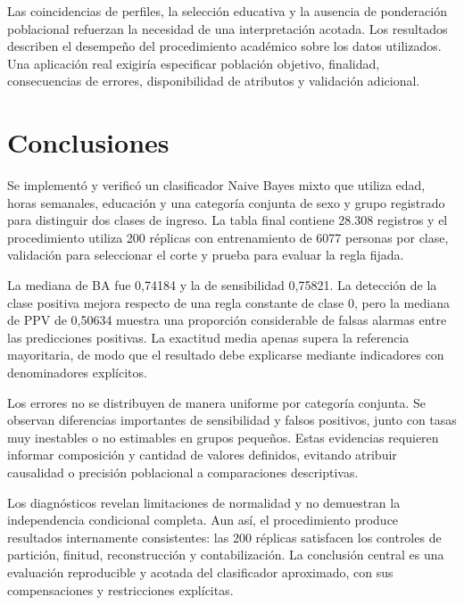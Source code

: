 \documentclass[11pt,a4paper]{article}
\begin{document}
Las coincidencias de perfiles, la selección educativa y la ausencia de ponderación poblacional refuerzan la necesidad de una interpretación acotada. Los resultados describen el desempeño del procedimiento académico sobre los datos utilizados. Una aplicación real exigiría especificar población objetivo, finalidad, consecuencias de errores, disponibilidad de atributos y validación adicional.

\section{Conclusiones}
Se implementó y verificó un clasificador Naive Bayes mixto que utiliza edad, horas semanales, educación y una categoría conjunta de sexo y grupo registrado para distinguir dos clases de ingreso. La tabla final contiene 28.308 registros y el procedimiento utiliza 200 réplicas con entrenamiento de 6077 personas por clase, validación para seleccionar el corte y prueba para evaluar la regla fijada.

La mediana de BA fue 0,74184 y la de sensibilidad 0,75821. La detección de la clase positiva mejora respecto de una regla constante de clase 0, pero la mediana de PPV de 0,50634 muestra una proporción considerable de falsas alarmas entre las predicciones positivas. La exactitud media apenas supera la referencia mayoritaria, de modo que el resultado debe explicarse mediante indicadores con denominadores explícitos.

Los errores no se distribuyen de manera uniforme por categoría conjunta. Se observan diferencias importantes de sensibilidad y falsos positivos, junto con tasas muy inestables o no estimables en grupos pequeños. Estas evidencias requieren informar composición y cantidad de valores definidos, evitando atribuir causalidad o precisión poblacional a comparaciones descriptivas.

Los diagnósticos revelan limitaciones de normalidad y no demuestran la independencia condicional completa. Aun así, el procedimiento produce resultados internamente consistentes: las 200 réplicas satisfacen los controles de partición, finitud, reconstrucción y contabilización. La conclusión central es una evaluación reproducible y acotada del clasificador aproximado, con sus compensaciones y restricciones explícitas.
\end{document}
